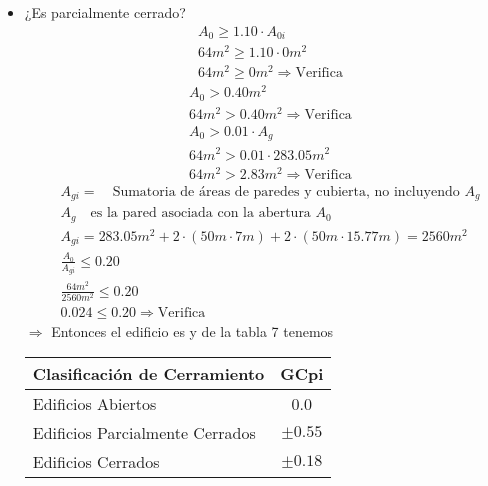\begin{enumerate}
\begin{itemize}
\item ¿Es parcialmente cerrado?
\begin{align*}
& A_0 \geq 1.10 \cdot A_{0i} \\
& 64 m^2 \geq 1.10 \cdot 0 m^2 \\
& 64 m^2 \geq 0 m^2 \Rightarrow \text{Verifica}
\end{align*}
\begin{align*}
& A_0 > 0.40 m^2 \\
& 64 m^2 > 0.40 m^2 \Rightarrow \text{Verifica}
\end{align*}
\begin{align*}
& A_0 > 0.01 \cdot A_g \\
& 64 m^2 > 0.01 \cdot 283.05 m^2 \\
& 64 m^2 > 2.83 m^2 \Rightarrow \text{Verifica}
\end{align*}
\begin{align*}
& A_{gi} = \quad\text{Sumatoria de áreas de paredes y cubierta, no incluyendo $A_g$} \\
& A_g \quad\text{es la pared asociada con la abertura $A_0$}\\
& A_{gi} = 283.05 m^2 + 2 \cdot (50m \cdot 7m) + 2 \cdot (50m \cdot 15.77m) = 2560 m^2 \\
& \frac{A_0}{A_{gi}} \leq 0.20 \\
& \frac{64 m^2}{2560 m^2} \leq 0.20 \\
& 0.024 \leq 0.20 \Rightarrow \text{Verifica}
\end{align*}
$\Rightarrow$ Entonces el edificio es  y de la tabla 7 tenemos 

\begin{table}[H]
  \begin{center}
    \begin{tabular}{l|c} %
      Clasificación de Cerramiento & GCpi \\
      \hline
      Edificios Abiertos & 0.0 \\
      Edificios Parcialmente Cerrados & $\pm 0.55$ \\
      Edificios Cerrados & $\pm 0.18$ \\
    \end{tabular}
  \end{center}
\end{table}

\end{itemize}
\newpage


\end{enumerate}
